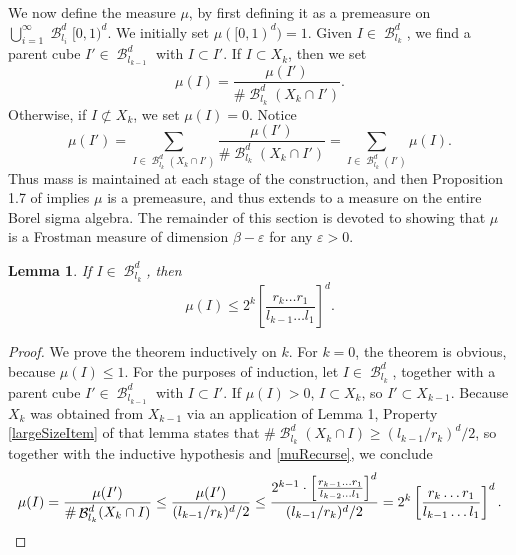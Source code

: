\documentclass[dvipsnames,letterpaper,12pt]{article}
\numberwithin{equation}{section}
\theoremstyle{plain}
\newtheorem{lemma}{Lemma}
\DeclareMathOperator{\B}{\mathcal{B}}
\begin{document}
We now define the measure $\mu$, by first defining it as a premeasure on $\bigcup_{i = 1}^\infty \B^d_{l_i}[0,1)^d$. We initially set $\mu([0,1)^d) = 1$. Given $I \in \B^d_{l_k}$, we find a parent cube $I' \in \B^d_{l_{k-1}}$ with $I \subset I'$. If $I \subset X_k$, then we set
%
\begin{equation} \label{muRecurse} \mu(I) = \frac{\mu(I')}{\# \B^d_{l_k}(X_k \cap I')}. \end{equation}
%
Otherwise, if $I \not \subset X_k$, we set $\mu(I) = 0$. Notice
%
\[ \mu(I') = \sum_{I \in \B^d_{l_k}(X_k \cap I')} \frac{\mu(I')}{\# \B^d_{l_k}(X_k \cap I')} = \sum_{I \in \B^d_{l_k}(I')} \mu(I). \]
%
Thus mass is maintained at each stage of the construction, and then Proposition 1.7 of \cite{Falconer} implies $\mu$ is a premeasure, and thus extends to a measure on the entire Borel sigma algebra. The remainder of this section is devoted to showing that $\mu$ is a Frostman measure of dimension $\beta - \varepsilon$ for any $\varepsilon > 0$.


\begin{lemma} \label{muBoundLemma}
	If $I \in \B^d_{l_k}$, then
	\begin{equation} \label{muBound}
		\mu(I) \leq 2^k \left[ \frac{r_k \dots r_1}{l_{k-1} \dots l_1} \right]^d.
	\end{equation}
\end{lemma}
\begin{proof}
	We prove the theorem inductively on $k$. For $k = 0$, the theorem is obvious, because $\mu(I) \leq 1$. For the purposes of induction, let $I \in \B^d_{l_k}$, together with a parent cube $I' \in \B^d_{l_{k-1}}$ with $I \subset I'$. If $\mu(I) > 0$, $I \subset X_k$, so $I' \subset X_{k-1}$. Because $X_k$ was obtained from $X_{k-1}$ via an application of Lemma 1, Property \ref{largeSizeItem} of that lemma states that $\# \B^d_{l_k}(X_k \cap I) \geq (l_{k-1}/r_k)^d/2$, so together with the inductive hypothesis and \eqref{muRecurse}, we conclude
	\[ \mu(I) = \frac{\mu(I')}{\# \B^d_{l_k}(X_k \cap I)} \leq \frac{\mu(I')}{(l_{k-1}/r_k)^d/2} \leq \frac{2^{k-1} \cdot \left[ \frac{r_{k-1} \dots r_1}{l_{k-2} \dots l_1} \right]^d}{(l_{k-1}/r_k)^d/2} = 2^k \left[ \frac{r_k \dots r_1}{l_{k-1} \dots l_1} \right]^d. \qedhere \]
\end{proof}
\end{document}
